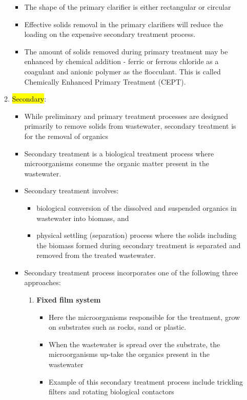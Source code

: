 \begin{itemize}
\begin{enumerate}
\begin{itemize}
		\item The shape of the primary clarifier is either rectangular or circular
		\item Effective solids removal in the primary clarifiers will reduce the loading on the expensive secondary treatment 			process.
		\item The amount of solids removed during primary treatment may be enhanced by chemical addition - ferric or ferrous 			chloride as a coagulant and anionic polymer as the flocculant.  This is called Chemically Enhanced Primary Treatment 			(CEPT).
		\end{itemize}
\item \hl{Secondary}:

		\begin{itemize}
		\item While preliminary and primary treatment processes are designed primarily to remove solids from wastewater, 				secondary treatment is for the removal of organics
		\item Secondary treatment is a biological treatment process where microorganisms consume the organic matter present in 			the wastewater.
		\item Secondary treatment involves:
			\begin{itemize}
			\item biological conversion of the dissolved and suspended organics in wastewater into biomass, and
			\item physical settling (separation) process where the solids including the biomass formed during secondary 					treatment is separated and removed from the treated wastewater.
			\end{itemize}
		\item Secondary treatment process incorporates one of the following three approaches:
			\begin{enumerate}
			\item \textbf{Fixed film system}
				\begin{itemize}
				\item Here the microorganisms responsible for the treatment, grow on substrates such
				as rocks, sand or plastic.
				\item When the wastewater is spread over the substrate, the microorganisms up-take the organics present in 						the wastewater
				\item Example of this secondary treatment process include trickling filters and rotating biological 							contactors
				\end{itemize}

\end{enumerate}
\end{itemize}
\end{enumerate}
\end{itemize}
